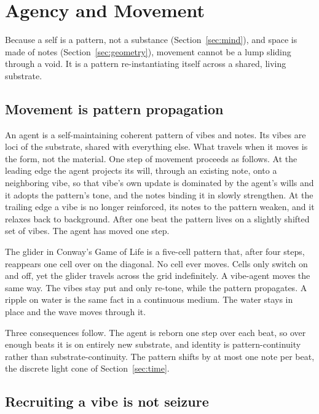 \section{Agency and Movement}
\label{sec:movement}

Because a self is a pattern, not a substance (Section~\ref{sec:mind}), and space is made of notes (Section~\ref{sec:geometry}), movement cannot be a lump sliding through a void. It is a pattern re-instantiating itself across a shared, living substrate.

\subsection{Movement is pattern propagation}

An agent is a self-maintaining coherent pattern of vibes and notes. Its vibes are loci of the substrate, shared with everything else. What travels when it moves is the form, not the material. One step of movement proceeds as follows. At the leading edge the agent projects its will, through an existing note, onto a neighboring vibe, so that vibe's own update is dominated by the agent's wills and it adopts the pattern's tone, and the notes binding it in slowly strengthen. At the trailing edge a vibe is no longer reinforced, its notes to the pattern weaken, and it relaxes back to background. After one beat the pattern lives on a slightly shifted set of vibes. The agent has moved one step.

\begin{proposition}
The glider in Conway's Game of Life is a five-cell pattern that, after four steps, reappears one cell over on the diagonal. No cell ever moves. Cells only switch on and off, yet the glider travels across the grid indefinitely. A vibe-agent moves the same way. The vibes stay put and only re-tone, while the pattern propagates. A ripple on water is the same fact in a continuous medium. The water stays in place and the wave moves through it.
\end{proposition}

Three consequences follow. The agent is reborn one step over each beat, so over enough beats it is on entirely new substrate, and identity is pattern-continuity rather than substrate-continuity. The pattern shifts by at most one note per beat, the discrete light cone of Section~\ref{sec:time}.

\subsection{Recruiting a vibe is not seizure}

